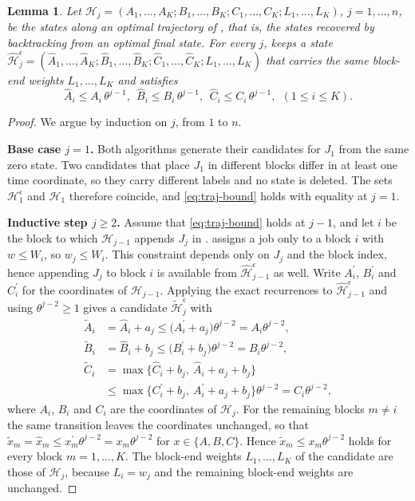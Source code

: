 \documentclass[12pt]{article}
\newtheorem{lemma}{Lemma}[section]
\begin{document}
\begin{sloppypar}
\begin{lemma}\label{lem:traj-approx}
Let $\mathscr{H}_{j}=(A_1,\dots,A_K; B_1,\dots,B_K; C_1,\dots,C_K; L_1,\dots,L_K)$, $j=1,\dots,n$, be the
states along an optimal trajectory of , that is, the states recovered by
backtracking from an optimal final state. For every $j$,  keeps a state
$\hat{\mathscr{H}}^{\epsilon}_{j}=(\hat A_1,\dots,\hat A_K; \hat B_1,\dots,\hat B_K; \hat C_1,\dots,\hat C_K; L_1,\dots, L_K)$
that carries the same block-end weights $L_1,\dots,L_K$ and satisfies
\begin{equation}\label{eq:traj-bound}
\hat A_i\le A_i\,\theta^{j-1},~~
\hat B_i\le B_i\,\theta^{j-1},~~
\hat C_i\le C_i\,\theta^{j-1},~~(1\le i\le K).
\end{equation}
\end{lemma}

\begin{proof}
We argue by induction on $j$, from $1$ to $n$.

\textbf{Base case $j=1$.} Both algorithms generate their candidates for $J_1$ from the same zero
state. Two candidates that place $J_1$ in different blocks differ in at least one time coordinate,
so they carry different labels and no state is deleted. The sets $\mathscr{H}^{\epsilon}_{1}$ and
$\mathscr{H}_{1}$ therefore coincide, and \cref{eq:traj-bound} holds with equality at $j=1$.

\textbf{Inductive step $j\ge2$.} Assume that \cref{eq:traj-bound} holds at $j-1$, and let $i$ be the
block to which $\mathscr{H}_{j-1}$ appends $J_j$ in . 
assigns a job only to a block $i$ with $w\le W_i$, so $w_j\le W_i$. This constraint depends only on
$J_j$ and the block index, hence appending $J_j$ to block $i$ is available from
$\hat{\mathscr{H}}^{\epsilon}_{j-1}$ as well. Write $A^{\prime}_i$, $B^{\prime}_i$ and $C^{\prime}_i$
for the coordinates of $\mathscr{H}_{j-1}$. Applying the exact recurrences to
$\hat{\mathscr{H}}^{\epsilon}_{j-1}$ and using $\theta^{j-2}\ge1$ gives a candidate
$\tilde{\mathscr{H}}^{\epsilon}_{j}$ with
\begin{align*}
\tilde A_{i} &= \hat A_{i}+a_j
   \le \big(A^{\prime}_{i}+a_j\big)\theta^{j-2}=A_{i}\theta^{j-2},\\
\tilde B_{i} &= \hat B_{i}+b_j
   \le \big(B^{\prime}_{i}+b_j\big)\theta^{j-2}=B_{i}\theta^{j-2},\\
\tilde C_{i} &= \max\big\{\hat C_{i}+b_j,\ \hat A_{i}+a_j+b_j\big\}\\
   &\le \max\big\{C^{\prime}_{i}+b_j,\ A^{\prime}_{i}+a_j+b_j\big\}\theta^{j-2}
   = C_{i}\theta^{j-2},
\end{align*}
where $A_i$, $B_i$ and $C_i$ are the coordinates of $\mathscr{H}_{j}$. For the remaining blocks
$m\ne i$ the same transition leaves the coordinates unchanged, so that
$\tilde x_m=\hat x_m\le x^{\prime}_m\theta^{j-2}=x_m\theta^{j-2}$ for $x\in\{A,B,C\}$. Hence
$\tilde x_m\le x_m\theta^{j-2}$ holds for every block $m=1,\dots,K$. The block-end weights
$L_1,\dots,L_K$ of the candidate are those of $\mathscr{H}_{j}$, because $L_i=w_j$ and the
remaining block-end weights are unchanged.


\end{proof}
\end{sloppypar}
\end{document}
